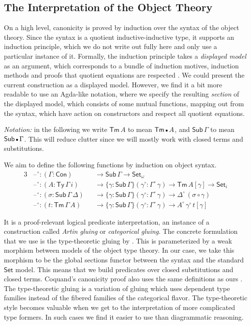 \documentclass[acmsmall,screen,review,anonymous]{acmart}
\newcommand{\msf}[1]{{\mathsf{#1}}}
\newcommand{\Set}{\msf{Set}}
\newcommand{\blank}{{\mathord{\hspace{1pt}\text{--}\hspace{1pt}}}}
\newcommand{\emptycon}{\scaleobj{.75}\bullet}
\newcommand{\Con}{\msf{Con}}
\newcommand{\Sub}{\msf{Sub}}
\newcommand{\Ty}{\msf{Ty}}
\newcommand{\Tm}{\msf{Tm}}
\newcommand{\w}{\circ}
\begin{document}
\subsection{The Interpretation of the Object Theory}\label{sec:canonicity-model}

On a high level, canonicity is proved by induction over the syntax of the object theory. Since the
syntax is a quotient inductive-inductive type, it supports an induction principle, which we do not
write out fully here and only use a particular instance of it. Formally, the induction principle
takes a \emph{displayed model} as an argument, which corresponds to a bundle of induction motives,
induction methods and proofs that quotient equations are respected
\cite[Chapter~4]{DBLP:journals/corr/abs-2302-08837}. We could present the current construction as a
displayed model. However, we find it a bit more readable to use an Agda-like notation, where we
specify the resulting \emph{section} of the displayed model, which consists of some mutual
functions, mapping out from the syntax, which have action on constructors and respect all quotient
equations.

\emph{Notation:} in the following we write $\Tm\,A$ to mean $\Tm\,\emptycon\,A$, and
$\Sub\,\Gamma$ to mean $\Sub\,\emptycon\,\Gamma$. This will reduce clutter since we will mostly work
with closed terms and substitutions.

We aim to define the following functions by induction on object syntax.
\begin{alignat*}{3}
  &\blank^\w : (\Gamma : \Con)      && \to \Sub\,\Gamma \to \Set_\omega\\
  &\blank^\w : (A : \Ty\,\Gamma\,i) && \to \{\gamma : \Sub\,\Gamma\}(\gamma^\w : \Gamma^\w\,\gamma) \to \Tm\,A[\gamma] \to \Set_i\\
  &\blank^\w : (\sigma : \Sub\,\Gamma\,\Delta) && \to \{\gamma : \Sub\,\Gamma\}(\gamma^\w : \Gamma^\w\,\gamma) \to \Delta^\w\,(\sigma \circ \gamma)\\
  &\blank^\w : (t : \Tm\,\Gamma\,A) && \to \{\gamma : \Sub\,\Gamma\}(\gamma^\w : \Gamma^\w\,\gamma) \to A^\w\,\gamma^\w\,t[\gamma]
\end{alignat*}

It is a proof-relevant logical predicate interpretation, an instance of a construction called
\emph{Artin gluing} \cite[Exposé~4,~Section~9.5]{SGA4} or \emph{categorical gluing}. The concrete
formulation that we use is the type-theoretic gluing by \citet{gluing}. This is parameterized by a
weak morphism between models of the object type theory. In our case, we take this morphism to be the
global sections functor between the syntax and the standard $\Set$ model. This means that we build
predicates over closed substitutions and closed terms. Coquand's canonicity proof also uses the same
definitions as ours \cite{coquand2018canonicity}. The type-theoretic gluing is a variation of gluing
which uses dependent type families instead of the fibered families of the categorical flavor. The
type-theoretic style becomes valuable when we get to the interpretation of more complicated type
formers. In such cases we find it easier to use than diagrammatic reasoning.
\end{document}
